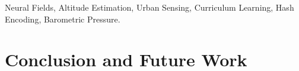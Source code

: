 \documentclass[lettersize,journal]{IEEEtran}
\begin{document}
\begin{IEEEkeywords}
Neural Fields, Altitude Estimation, Urban Sensing, Curriculum Learning, Hash Encoding, Barometric Pressure.
\end{IEEEkeywords}







% 





% 











\section{Conclusion and Future Work}
\label{sec:conclusion}
\end{document}
